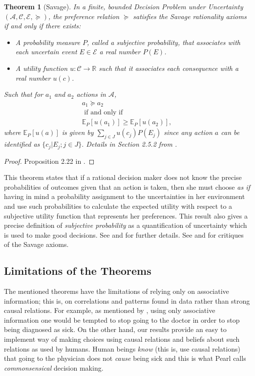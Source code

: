 \documentclass[review]{elsarticle}
\newtheorem{theorem}{Theorem}
\begin{document}
\begin{theorem}[Savage]{\label{savage}}
In a finite, bounded Decision Problem under Uncertainty $(\mathcal{A}, \mathcal{C}, \mathcal{E}, \succeq)$, the preference relation $\succeq$ satisfies the Savage rationality axioms if and only if there exists: 
\begin{itemize}
\item A \textit{probability measure} $P$, called a \textit{subjective probability}, that associates with each uncertain event $E \in \mathcal{E}$ a real number $P(E)$. 
\item A utility function $u : \mathcal{C} \to \mathbb{R}$ such that it associates each consequence with a real number $u(c)$. 
\end{itemize}
Such that for $a_1$ and $a_2$ actions in $\mathcal{A}$,
\begin{eqnarray*}
 &a_1 \succeq a_2&\\
 & \textrm{ if and only if }&\\
 &\mathbb{E}_P[u(a_1)] \geq  \mathbb{E}_P[u(a_2)],&
\end{eqnarray*}
where $\mathbb{E}_P[u(a)]$ is given by $\sum_{j \in J} u(c_j) P(E_j)$ since any action $a$ can be identified as $\{ c_j | E_j ; j \in J \}.$ Details in Section 2.5.2 from \cite{bernardo2000bayesian}.
\end{theorem}
\begin{proof}
Proposition 2.22 in \cite{bernardo2000bayesian}.
\end{proof}
This theorem states that if a rational decision maker does not know the precise probabilities of outcomes given that an action is taken, then she must choose \textit{as if} having in mind a probability assignment to the uncertainties in her environment and use such probabilities to calculate the expected utility with respect to a subjective utility function that represents her preferences. This result also gives a precise definition of \textit{subjective probability} as a quantification of uncertainty which is used to make good decisions. See \cite{hens1992note} and \cite{gilboa2009decision} for further details. See \cite{ellsberg1961risk} and \cite{binmore2008rational} for critiques of the Savage axioms. 

\subsection{Limitations of the Theorems}
\label{theorems_limitations}
The mentioned theorems have the limitations of relying only on associative information; this is, on correlations and patterns found in data rather than strong causal relations. For example, as mentioned by \cite{pearl2009causality}, using only associative information one would be tempted to stop going to the doctor in order to stop being diagnosed as sick. On the other hand, our results provide an easy to implement way of making choices using causal relations and beliefs about such relations as used by humans. Human beings \textit{know} (this is, use causal relations) that going to the physician does not \textit{cause} being sick and this is what Pearl calls \textit{commonsensical} decision making.
\end{document}
